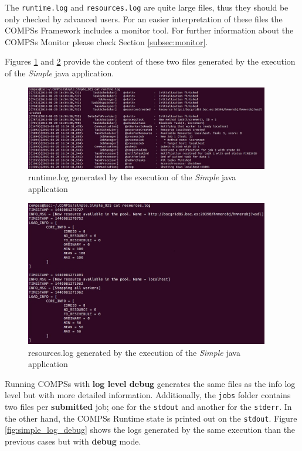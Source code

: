 The \texttt{runtime.log} and \texttt{resources.log} are quite large files, thus they should be only checked by advanced users. For an
easier interpretation of these files the COMPSs Framework includes a monitor tool. For further information about the COMPSs Monitor
please check Section \ref{subsec:monitor}.

Figures \ref{fig:simple_runtimelog} and \ref{fig:simple_resourceslog} provide the content of these two files generated
by the execution of the \textit{Simple} java application. 
\begin{figure}[h!]
  \centering
    \includegraphics[width=0.95\textwidth]{./Sections/3_Results_and_Logs/Figures/simple_runtimelog.jpeg}
    \caption{runtime.log generated by the execution of the \textit{Simple} java application}
    \label{fig:simple_runtimelog}
\end{figure}

\begin{figure}[h!]
  \centering
    \includegraphics[width=0.95\textwidth]{./Sections/3_Results_and_Logs/Figures/simple_resourceslog.jpeg}
    \caption{resources.log generated by the execution of the \textit{Simple} java application}
    \label{fig:simple_resourceslog}
\end{figure}

Running COMPSs with \textbf{log level debug} generates the same files as the info log level but with more detailed information.
Additionally, the \texttt{jobs} folder contains two files per \textbf{submitted} job; one for the \texttt{stdout} and another for
the \texttt{stderr}. In the other hand, the COMPSs Runtime state is printed out on the \texttt{stdout}. Figure 
\ref{fig:simple_log_debug} shows the logs generated by the same execution than the previous cases 
but with \textbf{debug} mode. 

